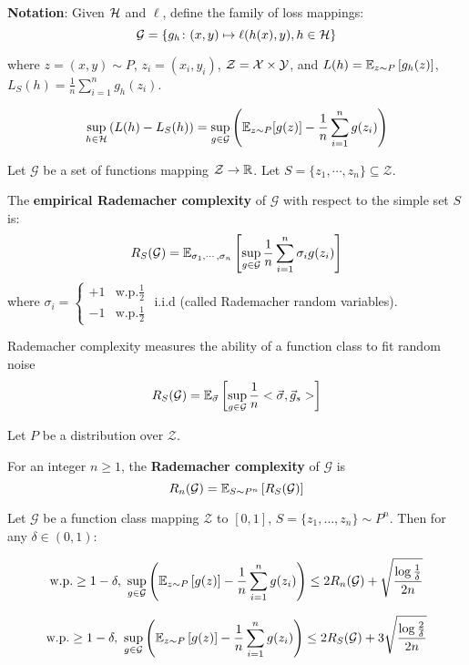 \textbf{Notation}: Given \(\mathcal{H}\) and \(\ell\), define the family of loss mappings: 
\[
    \mathcal{G} = \{ g_h \colon (x, y) \mapsto \ell (h(x), y), h \in \mathcal{H} \}
\]

where \(z = (x, y) \sim P\), \(z_i = (x_i, y_i)\), \(\mathcal{Z} = \mathcal{X} \times \mathcal{Y}\), 
and \(L(h) = \mathbb{E}_{z \sim P} \left[ g_h(z) \right]\), \(L_S(h) = \frac{1}{n} \sum_{i=1}^n g_h(z_i)\). 

\[
    \sup_{h \in \mathcal{H}} \left(L(h) - L_S(h)\right) = \sup_{g \in \mathcal{G}} \left(
        \mathbb{E}_{z \sim P} [g(z)] - \frac{1}{n} \sum_{i=1}^n g(z_i)
    \right)    
\]


\begin{definition}
    Let \(\mathcal{G}\) be a set of functions mapping \(\mathcal{Z} \to \mathbb{R}\). 
    Let \(S = \{z_1, \cdots, z_n\} \subseteq \mathcal{Z}\). 

    The \textbf{empirical Rademacher complexity} of \(\mathcal{G}\) with respect to the simple 
    set \(S\) is: 
    \[
        R_S(\mathcal{G}) = \mathbb{E}_{\sigma_1, \cdots, \sigma_n} \left[ \sup_{g \in \mathcal{G}} \frac{1}{n} \sum_{i=1}^n \sigma_i g(z_i) \right]  
    \]
    where \(\sigma_i = \begin{cases}
        +1 & \text{w.p.} \frac{1}{2} \\ 
        -1 & \text{w.p.} \frac{1}{2}
    \end{cases}\) i.i.d (called Rademacher random variables). 
\end{definition}


\begin{remark}
    Rademacher complexity measures the ability of a function class to fit random noise 
    \[
        R_S(\mathcal{G}) = \mathbb{E}_{\vec{\sigma}} \left[ \sup_{g \in \mathcal{G}} \frac{1}{n} <\vec{\sigma}, \vec{g}_s> \right]  
    \]
\end{remark}


\begin{definition}
    Let \(P\) be a distribution over \(\mathcal{Z}\). 
    
    For an integer \(n \geq 1\), the \textbf{Rademacher complexity} of \(\mathcal{G}\) is 
    \[
        R_n(\mathcal{G}) = \mathbb{E}_{S \sim P^n} \left[ R_S(\mathcal{G}) \right]  
    \]
\end{definition}


\begin{theorem}
    Let \(\mathcal{G}\) be a function class mapping \(\mathcal{Z}\) to \([0,1]\), \(S = \{z_1, \ldots, z_n\} \sim P^n\). 
    Then for any \(\delta \in (0, 1)\): 

    \[
        \text{w.p.} \geq 1 - \delta, \  \sup_{g\in \mathcal{G}} \left(\mathbb{E}_{z \sim P} \left[ g(z) \right]
        - \frac{1}{n} \sum_{i=1}^n g(z_i) \right) \leq 2 R_n (\mathcal{G}) + \sqrt{\frac{\log \frac{1}{\delta}}{2n}} 
    \]

    \[
        \text{w.p.} \geq 1 - \delta, \  \sup_{g\in \mathcal{G}} \left(\mathbb{E}_{z \sim P} \left[ g(z) \right]
        - \frac{1}{n} \sum_{i=1}^n g(z_i) \right) \leq 2 R_S (\mathcal{G}) + 3\sqrt{\frac{\log \frac{2}{\delta}}{2n}} 
    \]
    
\end{theorem}



